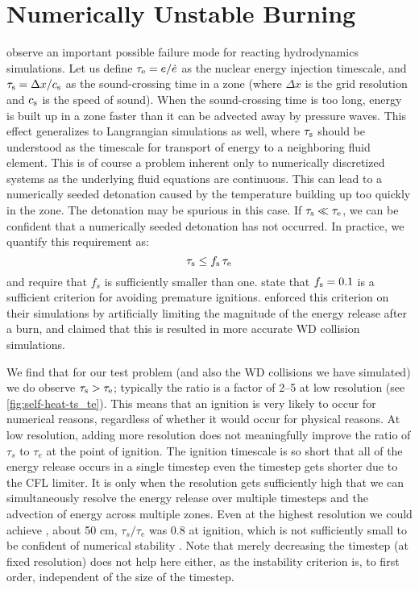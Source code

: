 \documentclass[twocolumn,numberedappendix,trackchanges]{aastex62}
\begin{document}
\section{Numerically Unstable Burning}
\label{sec:unstable_burning}

\citet{kushnir:2013} observe an important possible failure mode
for reacting hydrodynamics simulations. Let us define $\tau_{\rm e} = e / \dot{e}$
as the nuclear energy injection timescale, and $\tau_{\rm s} = \Delta x / c_{\rm s}$
as the sound-crossing time in a zone (where $\Delta x$ is the grid
resolution and $c_{\rm s}$ is the speed of sound). When the sound-crossing
time is too long, energy is built up in a zone faster than it can be
advected away by pressure waves. This effect generalizes to
Langrangian simulations as well, where $\tau_{\rm s}$ should be understood
as the timescale for transport of energy to a neighboring fluid element.
This is of course a problem inherent 
only to numerically discretized systems as the underlying fluid equations
are continuous. This can lead to a numerically seeded detonation
caused by the temperature building up too quickly in the zone. The
detonation may be spurious in this case. If $\tau_{\rm s} \ll \tau_{\rm e}$,
we can be confident that a numerically seeded detonation has not
occurred. In practice, we  quantify this requirement as:
\begin{equation}
  \tau_{\rm s} \leq f_{\rm s}\, \tau_{\rm e} \label{eq:burning_limiter}
\end{equation}
and require that $f_{s}$ is sufficiently smaller than one.
\citet{kushnir:2013} state that $f_{\rm s} = 0.1$ is a sufficient
criterion for avoiding premature ignitions. \citeauthor{kushnir:2013}
enforced this criterion on their simulations by artificially limiting
the magnitude of the energy release after a burn, and claimed that
this is resulted in more accurate WD collision simulations.

We find that for our test problem (and also the WD collisions we have simulated)
we do observe $\tau_{\rm s} > \tau_{\rm e}$; typically the ratio is a factor of 2--5 at
low resolution (see \autoref{fig:self-heat-ts_te}). This means that an ignition is
very likely to occur for numerical reasons, regardless of whether it would occur for physical reasons.
At low resolution, adding more resolution does not meaningfully improve the ratio of
$\tau_s$ to $\tau_e$ at the point of ignition. The ignition timescale is so short
that  all of the energy release occurs in a single timestep even  the
timestep gets shorter due to the CFL limiter. It is only when the resolution gets
sufficiently high that we can simultaneously resolve the energy release over multiple
timesteps and the advection of energy across multiple zones. Even at the highest resolution
we could achieve , about 50 cm, $\tau_s / \tau_e$ was 0.8 at ignition, which is not
sufficiently small to be confident of numerical stability . Note
that merely decreasing the timestep (at fixed resolution) does not help here either, as the
instability criterion is, to first order, independent of the size of the timestep.
\end{document}
